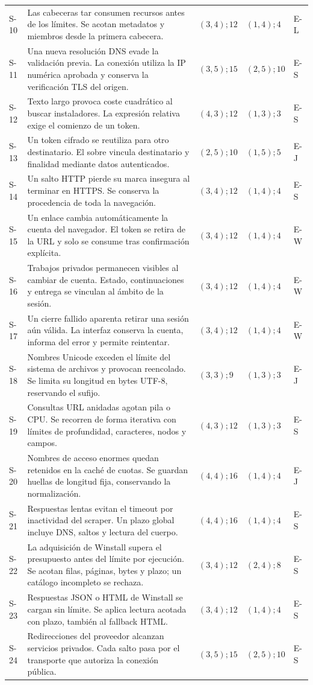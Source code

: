 \begin{longtable}{@{}p{}>{\raggedright\arraybackslash}p{}p{}p{}p{}@{}}
	S-10 & Las cabeceras tar consumen recursos antes de los límites. Se acotan metadatos y miembros desde la primera cabecera. & $(3,4);12$ & $(1,4);4$ & E-L\\
	S-11 & Una nueva resolución DNS evade la validación previa. La conexión utiliza la IP numérica aprobada y conserva la verificación TLS del origen. & $(3,5);15$ & $(2,5);10$ & E-S\\
	S-12 & Texto largo provoca coste cuadrático al buscar instaladores. La expresión relativa exige el comienzo de un token. & $(4,3);12$ & $(1,3);3$ & E-S\\
	S-13 & Un token cifrado se reutiliza para otro destinatario. El sobre \ruta{enc:v2} vincula destinatario y finalidad mediante datos autenticados. & $(2,5);10$ & $(1,5);5$ & E-J\\
	S-14 & Un salto HTTP pierde su marca insegura al terminar en HTTPS. Se conserva la procedencia de toda la navegación. & $(3,4);12$ & $(1,4);4$ & E-S\\
	S-15 & Un enlace cambia automáticamente la cuenta del navegador. El token se retira de la URL y solo se consume tras confirmación explícita. & $(3,4);12$ & $(1,4);4$ & E-W\\
	S-16 & Trabajos privados permanecen visibles al cambiar de cuenta. Estado, continuaciones y entrega se vinculan al ámbito de la sesión. & $(3,4);12$ & $(1,4);4$ & E-W\\
	S-17 & Un cierre fallido aparenta retirar una sesión aún válida. La interfaz conserva la cuenta, informa del error y permite reintentar. & $(3,4);12$ & $(1,4);4$ & E-W\\
	S-18 & Nombres Unicode exceden el límite del sistema de archivos y provocan reencolado. Se limita su longitud en bytes UTF-8, reservando el sufijo. & $(3,3);9$ & $(1,3);3$ & E-J\\
	S-19 & Consultas URL anidadas agotan pila o CPU. Se recorren de forma iterativa con límites de profundidad, caracteres, nodos y campos. & $(4,3);12$ & $(1,3);3$ & E-S\\
	S-20 & Nombres de acceso enormes quedan retenidos en la caché de cuotas. Se guardan huellas de longitud fija, conservando la normalización. & $(4,4);16$ & $(1,4);4$ & E-J\\
	S-21 & Respuestas lentas evitan el timeout por inactividad del scraper. Un plazo global incluye DNS, saltos y lectura del cuerpo. & $(4,4);16$ & $(1,4);4$ & E-S\\
	S-22 & La adquisición de Winstall supera el presupuesto antes del límite por ejecución. Se acotan filas, páginas, bytes y plazo; un catálogo incompleto se rechaza. & $(3,4);12$ & $(2,4);8$ & E-S\\
	S-23 & Respuestas JSON o HTML de Winstall se cargan sin límite. Se aplica lectura acotada con plazo, también al fallback HTML. & $(3,4);12$ & $(1,4);4$ & E-S\\
	S-24 & Redirecciones del proveedor alcanzan servicios privados. Cada salto pasa por el transporte que autoriza la conexión pública. & $(3,5);15$ & $(2,5);10$ & E-S\\
	\bottomrule
\end{longtable}

